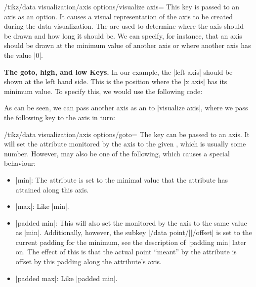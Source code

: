 \begin{key}{/tikz/data visualization/axis options/visualize axis=}
    This key is passed to an axis as an option. It causes a visual
    representation of the axis to be created during the data visualization. The
     are used to determine where the axis should be drawn and how
    long it should be. We can specify, for instance, that an axis should be
    drawn at the minimum value of another axis or where another axis has the
    value |0|.


    \medskip
    \textbf{The goto, high, and low Keys.}
    In our example, the |left axis| should be shown at the left hand side. This
    is the position where the |x axis| has its minimum value. To specify this,
    we would use the following code:
\begin{codeexample}[code only]
left axis={ visualize axis={ x axis={ goto=min } }
\end{codeexample}
    As can be seen, we can pass another axis as an  to
    |visualize axis|, where we pass the following key to the axis in turn:
    \begin{key}{/tikz/data visualization/axis options/goto=}
        The key can be passed to an axis. It will set the attribute monitored
        by the axis to the given , which is usually some number.
        However,  may also be one of the following, which causes a
        special behaviour:
        \begin{itemize}
            \item |min|: The attribute is set to the minimal value that the
                attribute has attained along this axis.
            \item |max|: Like |min|.
            \item |padded min|: This will also set the 
                monitored by the axis to the same value  as |min|.
                Additionally, however, the subkey
                |/data point/||/offset| is set to the current
                padding for the minimum, see the description of |padding min|
                later on. The effect of this is that the actual point ``meant''
                by the attribute is offset by this padding along the
                attribute's axis.
            \item |padded max|: Like |padded min|.
        \end{itemize}
    \end{key}


\end{key}
